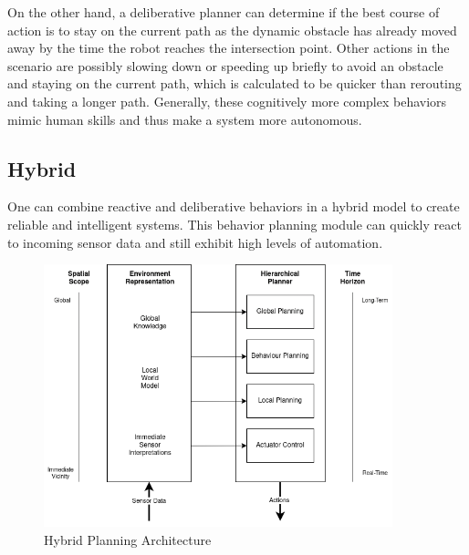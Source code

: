 On the other hand, a deliberative planner can determine if the best course of action is to stay on the current path as the dynamic obstacle has already moved away by the time the robot reaches the intersection point. Other actions in the scenario are possibly slowing down or speeding up briefly to avoid an obstacle and staying on the current path, which is calculated to be quicker than rerouting and taking a longer path. 
Generally, these cognitively more complex behaviors mimic human skills and thus make a system more autonomous. 

%

\subsection{Hybrid}

One can combine reactive and deliberative behaviors in a hybrid model to create reliable and intelligent systems. This behavior planning module can quickly react to incoming sensor data and still exhibit high levels of automation. 

\begin{figure}[ht]
	\centering
	\includegraphics[width=0.9\textwidth]{images/Deliberative_hierarchical_planning.png} 
	\caption{Hybrid Planning Architecture \cite{arkin1998}}
	\label{fig:hybrid_planning}
\end{figure}

